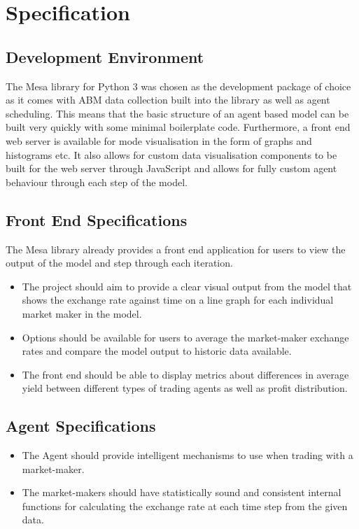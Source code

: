 \section{Specification}

\subsection{Development Environment}
The Mesa library for Python 3 was chosen as the development package of choice as it comes with ABM data collection built into the library as well as agent scheduling. This means that the basic structure of an agent based model can be built very quickly with some minimal boilerplate code. Furthermore, a front end web server is available for mode visualisation in the form of graphs and histograms etc. It also allows for custom data visualisation components to be built for the web server through JavaScript and allows for fully custom agent behaviour through each step of the model.

\subsection{Front End Specifications}
The Mesa library already provides a front end application for users to view the output of the model and step through each iteration. 
\begin{itemize}
\item The project should aim to provide a clear visual output from the model that shows the exchange rate against time on a line graph for each individual market maker in the model.
\item Options should be available for users to average the market-maker exchange rates and compare the model output to historic data available.
\item The front end should be able to display metrics about differences in average yield between different types of trading agents as well as profit distribution.
\end{itemize} 


\subsection{Agent Specifications}
\begin{itemize}
\item The Agent should provide intelligent mechanisms to use when trading with a market-maker.
\item The market-makers should have statistically sound and consistent internal functions for calculating the exchange rate at each time step from the given data.
\end{itemize}

